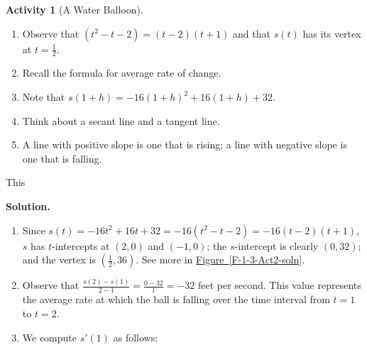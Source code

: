 \documentclass[10pt,]{book}
\theoremstyle{plain}
\theoremstyle{definition}
\theoremstyle{definition}
\theoremstyle{definition}
\theoremstyle{definition}
\newtheorem{activity}[project]{Activity}
\theoremstyle{definition}
\numberwithin{equation}{section}
\begin{document}
\begin{activity}[A Water Balloon]
\begin{enumerate}[label=\alph*]
\end{enumerate}
\leavevmode%
\begin{enumerate}[label=\alph*]
\item\hypertarget{li-145}{}Observe that \((t^2 - t - 2) = (t-2)(t+1)\) and that \(s(t)\) has its vertex at \(t = \frac{1}{2}\).%
\item\hypertarget{li-146}{}Recall the formula for average rate of change.%
\item\hypertarget{li-147}{}Note that \(s(1+h) = -16(1+h)^2 + 16(1+h) + 32\).%
\item\hypertarget{li-148}{}Think about a secant line and a tangent line.%
\item\hypertarget{li-149}{}A line with positive slope is one that is rising; a line with negative slope is one that is falling.%
\end{enumerate}
 This %
\par\medskip\noindent%
\textbf{Solution.}\quad \leavevmode%
\begin{enumerate}[label=\alph*]
\item\hypertarget{li-150}{}Since \(s(t) = -16t^2 + 16t + 32 = -16(t^2 - t - 2) = -16(t-2)(t+1)\), \(s\) has \(t\)-intercepts at \((2,0)\) and \((-1,0)\); the \(s\)-intercept is clearly \((0,32)\); and the vertex is \((\frac{1}{2},36)\).  See more in \hyperref[F-1-3-Act2-soln]{Figure~\ref{F-1-3-Act2-soln}}.%
\item\hypertarget{li-151}{}Observe that \(\frac{s(2)-s(1)}{2-1} = \frac{0 - 32}{1} = -32\) feet per second.  This value represents the average rate at which the ball is falling over the time interval from \(t = 1\) to \(t = 2\).%
\item\hypertarget{li-152}{}We compute \(s'(1)\) as follows:
            

\end{enumerate}
\end{activity}
\end{document}
